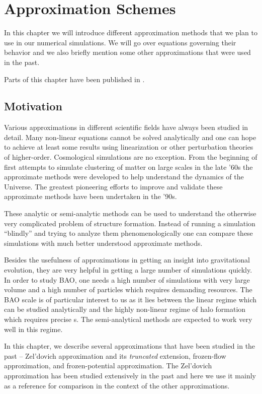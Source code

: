 \chapter{Approximation Schemes}
\label{chpt:app_schemes}
In this chapter we will introduce different approximation methods that we plan to use in our numerical simulations. We will go over equations governing their behavior and we also briefly mention some other approximations that were used in the past.

Parts of this chapter have been published in \textcite{2020MNRAS.493.2085V}.

\section{Motivation}
Various approximations in different scientific fields have always been studied in detail. Many non-linear equations cannot be solved analytically and one can hope to achieve at least some results using linearization or other perturbation theories of higher-order. Cosmological simulations are no exception. From the beginning of first attempts to simulate clustering of matter on large scales in the late '60s the approximate methods were developed to help understand the dynamics of the Universe. The greatest pioneering efforts to improve and validate these approximate methods have been undertaken in the '90s.

These analytic or semi-analytic methods can be used to understand the otherwise very complicated problem of structure formation. Instead of running a simulation ``blindly'' and trying to analyze them phenomenologically one can compare these simulations with much better understood approximate methods.

Besides the usefulness of approximations in getting an insight into gravitational evolution, they are very helpful in getting a large number of simulations quickly. In order to study BAO, one needs a high number of simulations with very large volume and a high number of particles which requires demanding resources. The BAO scale is of particular interest to us as it lies between the linear regime which can be studied analytically and the highly non-linear regime of halo formation which requires precise \nbodysim s. The semi-analytical methods are expected to work very well in this regime.

In this chapter, we describe several approximations that have been studied in the past -- Zel'dovich approximation and its \textit{truncated} extension, frozen-flow approximation, and frozen-potential approximation. The Zel'dovich approximation has been studied extensively in the past and here we use it mainly as a reference for comparison in the context of the other approximations.

